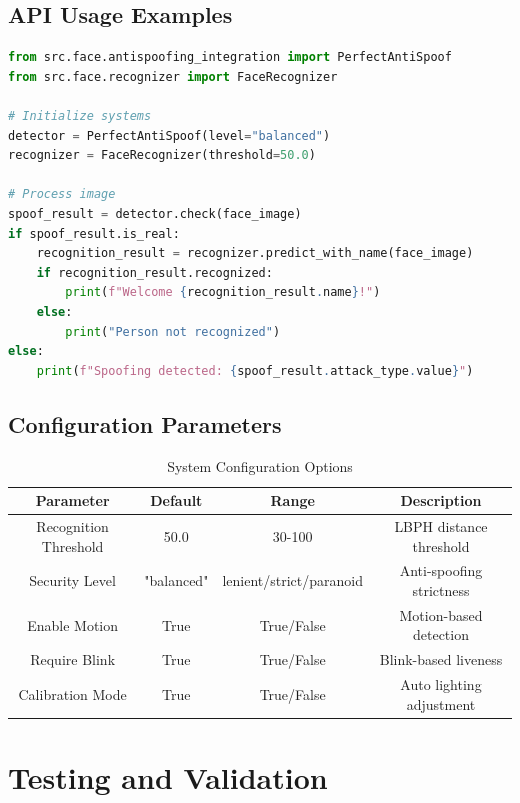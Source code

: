 \documentclass[12pt,a4paper]{article}
\begin{document}
\subsection{API Usage Examples}

\begin{lstlisting}[language=Python, caption=Basic Usage Example]
from src.face.antispoofing_integration import PerfectAntiSpoof
from src.face.recognizer import FaceRecognizer

# Initialize systems
detector = PerfectAntiSpoof(level="balanced")
recognizer = FaceRecognizer(threshold=50.0)

# Process image
spoof_result = detector.check(face_image)
if spoof_result.is_real:
    recognition_result = recognizer.predict_with_name(face_image)
    if recognition_result.recognized:
        print(f"Welcome {recognition_result.name}!")
    else:
        print("Person not recognized")
else:
    print(f"Spoofing detected: {spoof_result.attack_type.value}")
\end{lstlisting}

\subsection{Configuration Parameters}

\begin{table}[h!]
\centering
\caption{System Configuration Options}
\begin{tabular}{|c|c|c|c|}
\hline
\textbf{Parameter} & \textbf{Default} & \textbf{Range} & \textbf{Description} \\
\hline
Recognition Threshold & 50.0 & 30-100 & LBPH distance threshold \\
\hline
Security Level & "balanced" & lenient/strict/paranoid & Anti-spoofing strictness \\
\hline
Enable Motion & True & True/False & Motion-based detection \\
\hline
Require Blink & True & True/False & Blink-based liveness \\
\hline
Calibration Mode & True & True/False & Auto lighting adjustment \\
\hline
\end{tabular}
\end{table}

\section{Testing and Validation}
\end{document}
